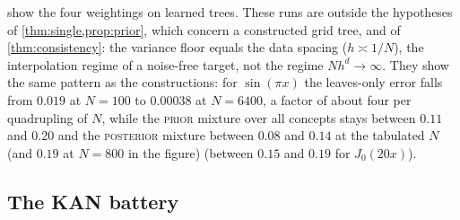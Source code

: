\documentclass[11pt]{article}
\theoremstyle{definition}
\theoremstyle{remark}
\begin{document}
\begin{table}[t]
\centering\small

\caption{Interior test RMSE of one learned tree (mean of three seeds), the data of
\cref{fig:weighting}.}
\label{tab:weighting}
\end{table}

 show the four weightings on learned trees.  These runs
are outside the hypotheses of \cref{thm:single,prop:prior}, which concern a constructed
grid tree, and of \cref{thm:consistency}: the variance floor equals the data spacing
($h\asymp1/N$), the interpolation regime of a noise-free target, not the regime
$Nh^d\to\infty$.  They show the same pattern as the constructions: for $\sin(\pi x)$ the
leaves-only error falls from $0.019$ at $N=100$ to $0.00038$ at $N=6400$, a factor of about
four per quadrupling of $N$, while the \textsc{prior} mixture over all concepts stays
between $0.11$ and $0.20$ and the \textsc{posterior} mixture between $0.08$ and $0.14$ at the tabulated $N$ (and
$0.19$ at $N=800$ in the figure)
(between $0.15$ and $0.19$ for $J_0(20x)$).

\subsection{The KAN battery}
\end{document}
